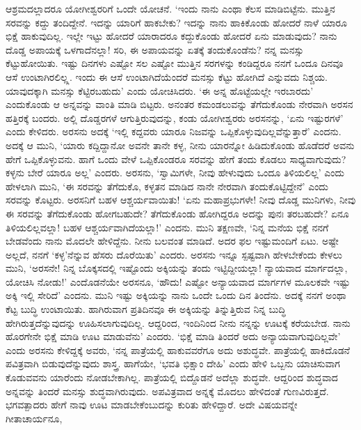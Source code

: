 ಆಶ್ರಮದಲ್ಲಾದರೂ ಯೋಗೀಶ್ವರರಿಗೆ ಒಂದೇ ಯೋಚನೆ. `ಇಂದು ನಾನು ಎಂಥಾ ಕೆಲಸ ಮಾಡಿಬಿಟ್ಟೆನು. ಮುತ್ತಿನ ಸರವನ್ನು ಕದ್ದು ತಂದಿದ್ದೇನೆ. ಇದನ್ನು ಯಾರಿಗೆ ಹಾಕಬೇಕು? ಇದನ್ನು ನಾನು ಹಾಕಿಕೊಂಡು ಹೋದರೆ ನಾಳೆ ಯಾರೂ ಭಿಕ್ಷೆ ಹಾಕುವುದಿಲ್ಲ. ಇಲ್ಲೇ ಇಟ್ಟು ಹೋದರೆ ಯಾರಾದರೂ ಕದ್ದುಕೊಂಡು ಹೋದರೆ ಏನು ಮಾಡುವುದು? ನಾನು ದೊಡ್ಡ ಅಪಾಯಕ್ಕೆ ಒಳಗಾದೆನಲ್ಲಾ! ಸರಿ, ಈ ಅಪಾಯವನ್ನು ಏತಕ್ಕೆ ತಂದುಕೊಂಡೆನು? ನನ್ನ ಮನಸ್ಸು ಕೆಟ್ಟುಹೋಯಿತು. ಇಷ್ಟು ದಿನಗಳು ಎಷ್ಟೋ ಸಲ ಎಷ್ಟೋ ಮುತ್ತಿನ ಸರಗಳನ್ನು ಕಂಡಿದ್ದರೂ ನನಗೆ ಒಂದೂ ದಿನವೂ ಆಸೆ ಉಂಟಾಗಿರಲಿಲ್ಲ್ಲ. ಇಂದು ಈ ಆಸೆ ಉಂಟಾಗಿದೆಯೆಂದರೆ ಮನಸ್ಸು ಕೆಟ್ಟು ಹೋಗಿದೆ ಎನ್ನುವದು ನಿಶ್ಚಯ. ಯಾವುದಕ್ಕಾಗಿ ಮನಸ್ಸು ಕೆಟ್ಟಿರಬಹುದು' ಎಂದು ಯೋಚಿಸಿದರು. `ಈ ಅನ್ನ ಹೊಟ್ಟೆಯಲ್ಲೇ ಇರಬಾರದು' ಎಂದುಕೊಂಡು ಆ ಅನ್ನವನ್ನು ವಾಂತಿ ಮಾಡಿ ಬಿಟ್ಟರು. ಅನಂತರ ಕಮಂಡಲುವನ್ನು ತೆಗೆದುಕೊಂಡು ನೇರವಾಗಿ ಅರಸನ ಹತ್ತಿರಕ್ಕೆ ಬಂದರು. ಅಲ್ಲಿ ದೊಡ್ಡರಗಳೆ ಆಗುತ್ತಿರುವುದನ್ನು, ಕಂಡು ಯೋಗೀಶ್ವರರು ಅರಸನನ್ನು, `ಏನು ಇಷ್ಟುರಗಳೆ' ಎಂದು ಕೇಳಿದರು. ಅರಸನು ಅದಕ್ಕೆ `ಇಲ್ಲಿ ಕದ್ದವರು ಯಾರೂ ನಿಜವನ್ನು ಒಪ್ಪಿಕೊಳ್ಳುವುದಿಲ್ಲವೆನ್ನುತ್ತಾರೆ' ಎಂದನು. ಅದಕ್ಕೆ ಆ ಮುನಿ, `ಯಾರು ಕದ್ದಿದ್ದಾನೋ ಅವನೇ ತಾನೇ ಕಳ್ಳ, ನೀನು ಯಾರನ್ನೋ ಹಿಡಿದುಕೊಂಡು ಹೊಡೆದರೆ ಅವನು ಹೇಗೆ ಒಪ್ಪಿಕೊಳ್ಳುವನು. ಹಾಗೆ ಒಂದು ವೇಳೆ ಒಪ್ಪಿಕೊಂಡರೂ ಸರವನ್ನು ಹೇಗೆ ತಂದು ಕೊಡಲು ಸಾಧ್ಯವಾಗುವುದು? ಕಳ್ಳನು ಬೇರೆ ಯಾರೂ ಅಲ್ಲ' ಎಂದರು. ಅರಸನು, `ಸ್ವಾಮಿಗಳೇ, ನೀವು ಹೇಳುವುದು ಒಂದೂ ತಿಳಿಯಲಿಲ್ಲ' ಎಂದು ಹೇಳಲಾಗಿ ಮುನಿ, `ಈ ಸರವನ್ನು ತೆಗೆದುಕೊ, ಕಳ್ಳತನ ಮಾಡಿದ ನಾನೇ ನೇರವಾಗಿ ತಂದುಕೊಟ್ಟಿದ್ದೇನೆ' ಎಂದು ಸರವನ್ನು ಕೊಟ್ಟರು. ಅರಸನಿಗೆ ಬಹಳ ಆಶ್ಚರ್ಯವಾಯಿತು! `ಏನು ಮಹಾಪ್ರಭುಗಳೇ! ನೀವು ದೊಡ್ಡ ಮುನಿಗಳು, ನೀವು ಈ ಸರವನ್ನು ತೆಗೆದುಕೊಂಡು ಹೋಗಬಹುದೇ? ತೆಗೆದುಕೊಂಡು ಹೋಗಿದ್ದರೂ ಅದನ್ನು ಪುನಃ ತರಬಹುದೇ? ಏನೂ ತಿಳಿಯಲಿಲ್ಲವಲ್ಲಾ! ಬಹಳ ಆಶ್ಚರ್ಯವಾಗಿದೆಯಲ್ಲಾ!' ಎಂದನು. ಮುನಿ ತಕ್ಷಣವೇ, `ನಿನ್ನ ಮನೆಯ ಭಿಕ್ಷೆ ನನಗೆ ಬೇಡವೆಂದು ನಾನು ಮೊದಲೇ ಹೇಳಿದ್ದೆನು. ನೀನು ಬಲವಂತ ಮಾಡಿದೆ. ಅದರ ಫಲ ಇಷ್ಟುಮಂದಿಗೆ ಏಟು. ಅಷ್ಟೇ ಅಲ್ಲದೆ, ನನಗೆ `ಕಳ್ಳ'ನೆನ್ನುವ ಹೆಸರು ದೊರೆಯಿತು' ಎಂದರು. ಅರಸನು ಇನ್ನೂ ಸ್ಪಷ್ಟವಾಗಿ ಹೇಳಬೇಕೆಂದು ಕೇಳಲು ಮುನಿ, `ಅರಸನೇ! ನಿನ್ನ ಬೊಕ್ಕಸದಲ್ಲಿ ಇಷ್ಟೊಂದು ಅಕ್ಕಿಯನ್ನು ತಂದು ಇಟ್ಟಿದ್ದೀಯಲ್ಲಾ! ನ್ಯಾಯವಾದ ಮಾರ್ಗದಲ್ಲಾ, ಯೋಚಿಸಿ ನೋಡು!' ಎಂದೊಡನೆಯೇ ಅರಸನೂ, `ಹೌದು! ಎಷ್ಟೋ ಅನ್ಯಾಯವಾದ ಮಾರ್ಗಗಳ ಮೂಲಕವೇ ಇಷ್ಟು ಅಕ್ಕಿ ಇಲ್ಲಿ ಸೇರಿದೆ' ಎಂದನು. ಮುನಿ ಇಷ್ಟು ಅಕ್ಕಿಯನ್ನು ನಾನು ಒಂದೇ ಒಂದು ದಿನ ತಿಂದೆನು. ಅದಕ್ಕೆ ನನಗೆ ಅಂಥಾ ಕೆಟ್ಟ ಬುದ್ಧಿ ಉಂಟಾಯಿತು. ಹಾಗಿರುವಾಗ ಪ್ರತಿದಿನವೂ ಈ ಅಕ್ಕಿಯನ್ನು ತಿನ್ನುತ್ತಿರುವ ನಿನ್ನ ಬುದ್ಧಿ ಹೇಗಿರುತ್ತದೆನ್ನುವುದನ್ನು ಊಹಿಸಲಾಗುವುದಿಲ್ಲ. ಆದ್ದರಿಂದ, ಇಂದಿನಿಂದ ನೀನು ನನ್ನನ್ನು ಊಟಕ್ಕೆ ಕರೆಯಬೇಡ. ನಾನು ಹೊರಗೇನೇ ಭಿಕ್ಷೆ ಮಾಡಿ ಊಟ ಮಾಡುವೆನು' ಎಂದರು. `ಭಿಕ್ಷೆ ಮಾಡಿ ತಿಂದರೆ ಅದು ಅನ್ಯಾಯವಾಗುವುದಿಲ್ಲವೇ' ಎಂದು ಅರಸನು ಕೇಳಿದ್ದಕ್ಕೆ ಅವರು, `ನನ್ನ ಪಾತ್ರೆಯಲ್ಲಿ ಹಾಕುವವರೆಗೂ ಅದು ಅಶುದ್ಧವೇ. ಪಾತ್ರೆಯಲ್ಲಿ ಹಾಕಿದೊಡನೆ ಪವಿತ್ರವಾಗಿ ಬಿಡುವುದೆನ್ನುವುದು ಶಾಸ್ತ್ರ. ಹಾಗೆಯೇ, `ಭವತಿ ಭಿಕ್ಷಾಂ ದೇಹಿ' ಎಂದು ಹೇಳಿ ಒಬ್ಬನು ಯಾಚಿಸುವಾಗ ಕೊಡುವವನು ಯಾರೆಂದು ನೋಡಬೇಕಾಗಿಲ್ಲ. ಪಾತ್ರೆಯಲ್ಲಿ ಬಿದ್ದೊಡನೆ ಅದೆಲ್ಲಾ ಶುದ್ಧವೇ. ಆದ್ದರಿಂದ ಶುದ್ಧವಾದ ಅನ್ನವನ್ನು ತಿಂದರೆ ಮನಸ್ಸು ಶುದ್ಧವಾಗಿರುವುದು. ಅಪವಿತ್ರವಾದ ಅನ್ನಕ್ಕೆ ಮೊದಲು ಹೇಳಿದಂತೆ ಗುಣವಿರುತ್ತದೆ. ಭಗವತ್ಪಾದರು ಹೇಗೆ ನಾವು ಊಟ ಮಾಡಬೇಕೆಂಬುದನ್ನು ಕುರಿತು ಹೇಳಿದ್ದಾರೆ. ಅದೇ ವಿಷಯವನ್ನೇ ಗೀತಾಚಾರ್ಯನೂ,

